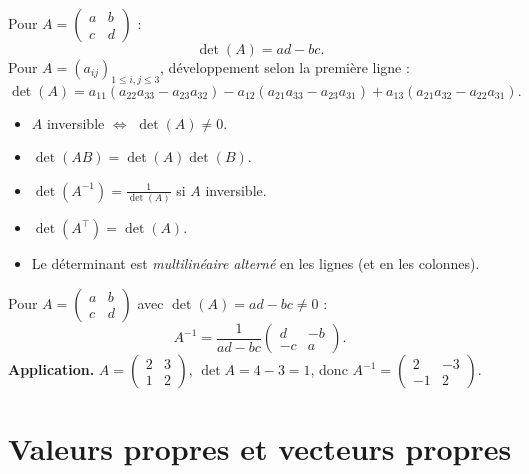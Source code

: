 \documentclass[11pt,a4paper,twoside]{book}
\begin{document}
\begin{theoremebox}
Pour $A = \begin{pmatrix} a & b \\ c & d \end{pmatrix}$ :
\[
  \det(A) = ad - bc.
\]
Pour $A = (a_{ij})_{1 \leq i,j \leq 3}$, développement selon la première ligne :
\[
  \det(A) = a_{11}(a_{22}a_{33}-a_{23}a_{32}) - a_{12}(a_{21}a_{33}-a_{23}a_{31}) + a_{13}(a_{21}a_{32}-a_{22}a_{31}).
\]
\end{theoremebox}

\begin{theoremebox}
\begin{itemize}
  \item $A$ inversible $\iff$ $\det(A) \neq 0$.
  \item $\det(AB) = \det(A)\det(B)$.
  \item $\det(A^{-1}) = \frac{1}{\det(A)}$ si $A$ inversible.
  \item $\det(A^\top) = \det(A)$.
  \item Le déterminant est \emph{multilinéaire alterné} en les lignes (et en les colonnes).
\end{itemize}
\end{theoremebox}

\begin{exemplebox}
Pour $A = \begin{pmatrix} a & b \\ c & d \end{pmatrix}$ avec $\det(A) = ad-bc \neq 0$ :
\[
  A^{-1} = \frac{1}{ad-bc}\begin{pmatrix} d & -b \\ -c & a \end{pmatrix}.
\]
\textbf{Application.} $A = \begin{pmatrix} 2 & 3 \\ 1 & 2 \end{pmatrix}$, $\det A = 4-3 = 1$,
donc $A^{-1} = \begin{pmatrix} 2 & -3 \\ -1 & 2 \end{pmatrix}$.
\end{exemplebox}

\section{Valeurs propres et vecteurs propres}
\end{document}
